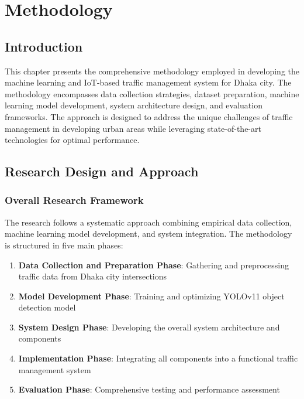 \chapter{Methodology}
\label{ch:methodology}

\section{Introduction}

This chapter presents the comprehensive methodology employed in developing the machine learning and IoT-based traffic management system for Dhaka city. The methodology encompasses data collection strategies, dataset preparation, machine learning model development, system architecture design, and evaluation frameworks. The approach is designed to address the unique challenges of traffic management in developing urban areas while leveraging state-of-the-art technologies for optimal performance.

\section{Research Design and Approach}

\subsection{Overall Research Framework}

The research follows a systematic approach combining empirical data collection, machine learning model development, and system integration. The methodology is structured in five main phases:

\begin{enumerate}
    \item \textbf{Data Collection and Preparation Phase}: Gathering and preprocessing traffic data from Dhaka city intersections
    \item \textbf{Model Development Phase}: Training and optimizing YOLOv11 object detection model
    \item \textbf{System Design Phase}: Developing the overall system architecture and components
    \item \textbf{Implementation Phase}: Integrating all components into a functional traffic management system
    \item \textbf{Evaluation Phase}: Comprehensive testing and performance assessment
\end{enumerate}

